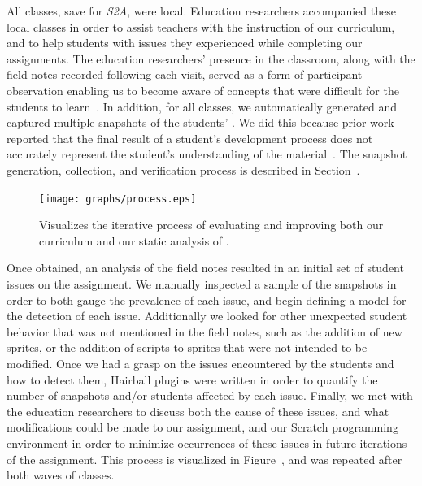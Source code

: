 All classes, save for \emph{S2A}, were local. Education researchers accompanied
these local classes in order to assist teachers with the instruction of our
curriculum, and to help students with issues they experienced while completing
our assignments. The education researchers' presence in the classroom, along
with the field notes recorded following each visit, served as a form of
participant observation enabling us to become aware of concepts that were
difficult for the students to learn~\cite{spradley80}. In addition, for all
classes, we automatically generated and captured multiple snapshots of the
students' . We did this because prior work reported that the final
result of a student's development process does not accurately represent the
student's understanding of the
material~\cite{Piech:2012:MSL:2157136.2157182,brennan12}. The snapshot
generation, collection, and verification process is described in
Section~.

\begin{figure}[!t]
\centering
\texttt{[image: graphs/process.eps]}
\caption{Visualizes the iterative process of evaluating and improving both our
  curriculum and our static analysis of .}
\end{figure}

Once obtained, an analysis of the field notes resulted in an initial set of
student issues on the assignment. We manually inspected a sample of the
snapshots in order to both gauge the prevalence of each issue, and begin
defining a model for the detection of each issue. Additionally we looked for
other unexpected student behavior that was not mentioned in the field notes,
such as the addition of new sprites, or the addition of scripts to sprites that
were not intended to be modified. Once we had a grasp on the issues encountered
by the students and how to detect them, Hairball plugins were written in order
to quantify the number of snapshots and/or students affected by each
issue. Finally, we met with the education researchers to discuss both the cause
of these issues, and what modifications could be made to our assignment, and
our Scratch programming environment in order to minimize occurrences of these
issues in future iterations of the assignment. This process is visualized in
Figure~, and was repeated after both waves of classes.

